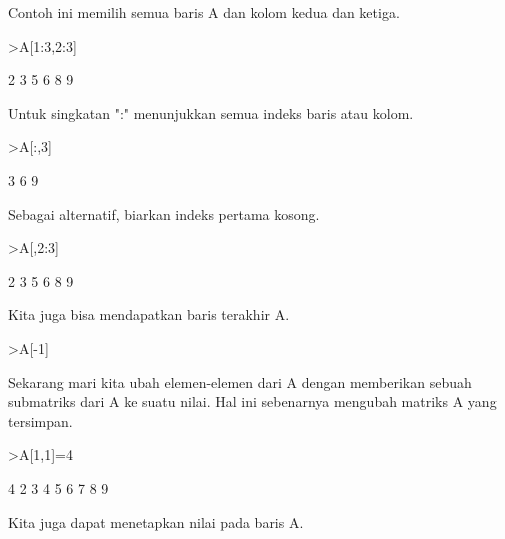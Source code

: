 \documentclass[a4paper,10pt]{article}
\begin{document}
\begin{eulernotebook}
\begin{eulercomment}
Contoh ini memilih semua baris A dan kolom kedua dan ketiga.
\end{eulercomment}
\begin{eulerprompt}
>A[1:3,2:3]
\end{eulerprompt}
\begin{euleroutput}
              2             3 
              5             6 
              8             9 
\end{euleroutput}
\begin{eulercomment}
Untuk singkatan ":" menunjukkan semua indeks baris atau kolom.
\end{eulercomment}
\begin{eulerprompt}
>A[:,3]
\end{eulerprompt}
\begin{euleroutput}
              3 
              6 
              9 
\end{euleroutput}
\begin{eulercomment}
Sebagai alternatif, biarkan indeks pertama kosong.
\end{eulercomment}
\begin{eulerprompt}
>A[,2:3]
\end{eulerprompt}
\begin{euleroutput}
              2             3 
              5             6 
              8             9 
\end{euleroutput}
\begin{eulercomment}
Kita juga bisa mendapatkan baris terakhir A.
\end{eulercomment}
\begin{eulerprompt}
>A[-1]
\end{eulerprompt}
\begin{euleroutput}
  [7,  8,  9]
\end{euleroutput}
\begin{eulercomment}
Sekarang mari kita ubah elemen-elemen dari A dengan memberikan sebuah
submatriks dari A ke suatu nilai. Hal ini sebenarnya mengubah matriks
A yang tersimpan.
\end{eulercomment}
\begin{eulerprompt}
>A[1,1]=4
\end{eulerprompt}
\begin{euleroutput}
              4             2             3 
              4             5             6 
              7             8             9 
\end{euleroutput}
\begin{eulercomment}
Kita juga dapat menetapkan nilai pada baris A.

\end{eulercomment}
\end{eulernotebook}
\end{document}
